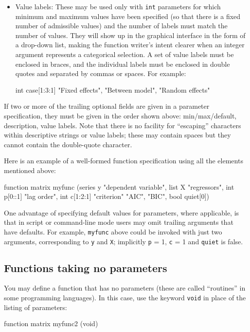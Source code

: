 \begin{itemize}
\item Value labels: These may be used only with \texttt{int}
  parameters for which minimum and maximum values have been specified
  (so that there is a fixed number of admissible values) and the
  number of labels must match the number of values. They will show up
  in the graphical interface in the form of a drop-down list, making
  the function writer's intent clearer when an integer argument
  represents a categorical selection. A set of value labels must be
  enclosed in braces, and the individual labels must be enclosed in
  double quotes and separated by commas or spaces.  For example:
%
\begin{code}
int case[1:3:1] {"Fixed effects", "Between model", "Random effects"}
\end{code} 

\end{itemize}

If two or more of the trailing optional fields are given in a
parameter specification, they must be given in the order shown above:
min/max/default, description, value labels. Note that there is no
facility for ``escaping'' characters within descriptive strings or
value labels; these may contain spaces but they cannot contain the
double-quote character.

Here is an example of a well-formed function specification using all
the elements mentioned above:
%
\begin{code}
function matrix myfunc (series y "dependent variable",
                        list X "regressors",
                        int p[0::1] "lag order",
                        int c[1:2:1] "criterion" {"AIC", "BIC"},
                        bool quiet[0])
\end{code} 

One advantage of specifying default values for parameters, where
applicable, is that in script or command-line mode users may omit
trailing arguments that have defaults. For example, \texttt{myfunc}
above could be invoked with just two arguments, corresponding to
\texttt{y} and \texttt{X}; implicitly \texttt{p} = 1, \texttt{c} = 1
and \texttt{quiet} is false.

\subsection{Functions taking no parameters}

You may define a function that has no parameters (these are called
``routines'' in some programming languages).  In this case,  
use the keyword \texttt{void} in place of the listing of parameters:
%    
\begin{code}
function matrix myfunc2 (void)
\end{code}


